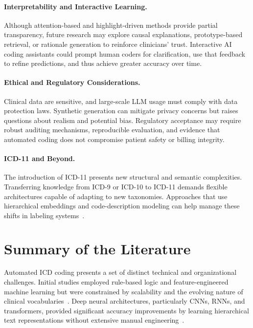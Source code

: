 \paragraph{Interpretability and Interactive Learning.} Although attention-based and highlight-driven methods provide partial transparency, future research may explore causal explanations, prototype-based retrieval, or rationale generation to reinforce clinicians’ trust. Interactive AI coding assistants could prompt human coders for clarification, use that feedback to refine predictions, and thus achieve greater accuracy over time.

\paragraph{Ethical and Regulatory Considerations.} Clinical data are sensitive, and large-scale LLM usage must comply with data protection laws. Synthetic generation can mitigate privacy concerns but raises questions about realism and potential bias. Regulatory acceptance may require robust auditing mechanisms, reproducible evaluation, and evidence that automated coding does not compromise patient safety or billing integrity.

\paragraph{ICD-11 and Beyond.} The introduction of ICD-11 presents new structural and semantic complexities. Transferring knowledge from ICD-9 or ICD-10 to ICD-11 demands flexible architectures capable of adapting to new taxonomies. Approaches that use hierarchical embeddings and code-description modeling can help manage these shifts in labeling systems~\citep{gaebel2020changes}.

\section{Summary of the Literature}

Automated ICD coding presents a set of distinct technical and organizational challenges. Initial studies employed rule-based logic and feature-engineered machine learning but were constrained by scalability and the evolving nature of clinical vocabularies~\citep{scheurwegs2017data}. Deep neural architectures, particularly CNNs, RNNs, and transformers, provided significant accuracy improvements by learning hierarchical text representations without extensive manual engineering~\citep{mullenbach2018explainable, li2020multi, heo2022medical}.

